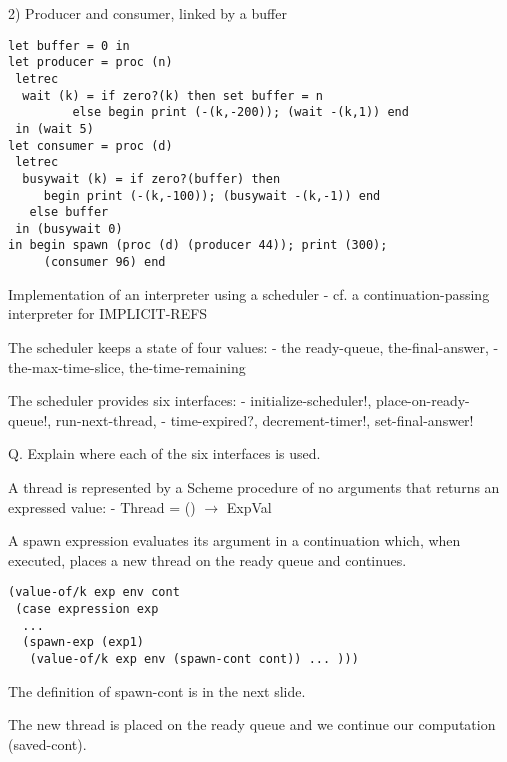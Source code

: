 \documentclass{article}
\begin{document}
\begin{huge}

2) Producer and consumer, linked by a buffer
\begin{lstlisting}
let buffer = 0 in
let producer = proc (n) 
 letrec
  wait (k) = if zero?(k) then set buffer = n 
         else begin print (-(k,-200)); (wait -(k,1)) end
 in (wait 5)
let consumer = proc (d) 
 letrec
  busywait (k) = if zero?(buffer) then
     begin print (-(k,-100)); (busywait -(k,-1)) end
   else buffer
 in (busywait 0)
in begin spawn (proc (d) (producer 44)); print (300);
     (consumer 96) end
\end{lstlisting}


Implementation of an interpreter using a scheduler \al
- cf. a continuation-passing interpreter for IMPLICIT-REFS

The scheduler keeps a state of four values: \al
- the ready-queue, the-final-answer, \al
- the-max-time-slice, the-time-remaining

The scheduler provides six interfaces: \al
- initialize-scheduler!, place-on-ready-queue!,  run-next-thread, \al
- time-expired?, decrement-timer!, set-final-answer!

Q. Explain where each of the six interfaces is used.

A thread is represented by a Scheme procedure of no arguments that returns an expressed value: \al
- Thread = () $\rightarrow$ ExpVal


A spawn expression evaluates its argument in a continuation which, when executed, places a new thread on the ready queue and continues.

\begin{lstlisting}
(value-of/k exp env cont
 (case expression exp 
  ...
  (spawn-exp (exp1) 
   (value-of/k exp env (spawn-cont cont)) ... )))
\end{lstlisting}

The definition of spawn-cont is in the next slide.

The new thread is placed on the ready queue and we continue our computation (saved-cont).


\end{huge}
\end{document}

